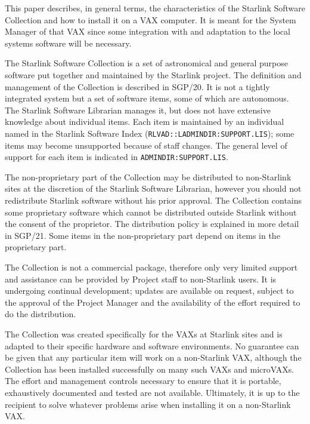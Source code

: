 This paper describes, in general terms, the characteristics of the Starlink
Software Collection and how to install it on a VAX computer. It is meant for
the System Manager of that VAX since some integration with and adaptation to
the local systems software will be necessary.

\vfill

The Starlink Software Collection is a set of astronomical and general purpose
software put together and maintained by the Starlink project. The definition
and management of the Collection is described in SGP/20. It is not a tightly
integrated system but a set of software items, some of which are autonomous.
The Starlink Software Librarian manages it, but does not have extensive
knowledge about individual items. Each item is maintained by an individual
named in the Starlink Software Index ({\tt RLVAD::LADMINDIR:SUPPORT.LIS}); some
items may become unsupported because of staff changes. The general level of
support for each item is indicated in {\tt ADMINDIR:SUPPORT.LIS}.

\vfill

The non-proprietary part of the Collection may be distributed to non-Starlink
sites at the discretion of the Starlink Software Librarian, however you should
not redistribute Starlink software without his prior approval. The Collection
contains some proprietary software which cannot be distributed outside Starlink
without the consent of the proprietor. The distribution policy is explained in
more detail in SGP/21. Some items in the non-proprietary part depend on items
in the proprietary part.

\vfill

The Collection is not a commercial package, therefore only very limited support
and assistance can be provided by Project staff to non-Starlink users. It is
undergoing continual development; updates are available on request, subject to
the approval of the Project Manager and the availability of the effort required
to do the distribution.

\vfill

The Collection was created specifically for the VAXs at Starlink sites and is
adapted to their specific hardware and software environments. No guarantee can
be given that any particular item will work on a non-Starlink VAX, although the
Collection has been installed successfully on many such VAXs and microVAXs. The
effort and management controls necessary to ensure that it is portable,
exhaustively documented and tested are not available. Ultimately, it is up to
the recipient to solve whatever problems arise when installing it on a
non-Starlink VAX.

